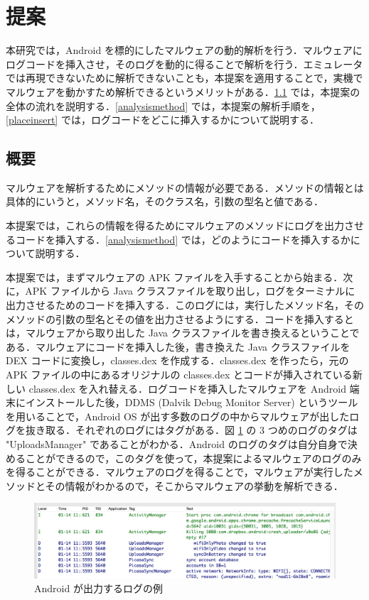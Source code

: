 \section{提案}
本研究では，Android を標的にしたマルウェアの動的解析を行う．マルウェアにログコードを挿入させ，そのログを動的に得ることで解析を行う．エミュレータでは再現できないために解析できないことも，本提案を適用することで，実機でマルウェアを動かすため解析できるというメリットがある．\ref{overview} では，本提案の全体の流れを説明する．\ref{analysismethod} では，本提案の解析手順を，\ref{placeinsert} では，ログコードをどこに挿入するかについて説明する．

\subsection{概要}
\label{overview}
マルウェアを解析するためにメソッドの情報が必要である．メソッドの情報とは具体的にいうと，メソッド名，そのクラス名，引数の型名と値である．

本提案では，これらの情報を得るためにマルウェアのメソッドにログを出力させるコードを挿入する．\ref{analysismethod} では，どのようにコードを挿入するかについて説明する．

本提案では，まずマルウェアの APK ファイルを入手することから始まる．次に，APK ファイルから Java クラスファイルを取り出し，ログをターミナルに出力させるためのコードを挿入する．このログには，実行したメソッド名，そのメソッドの引数の型名とその値を出力させるようにする．コードを挿入するとは，マルウェアから取り出した Java クラスファイルを書き換えるということである．マルウェアにコードを挿入した後，書き換えた Java クラスファイルを DEX コードに変換し，classes.dex を作成する．classes.dex を作ったら，元の APK ファイルの中にあるオリジナルの classes.dex とコードが挿入されている新しい classes.dex を入れ替える．ログコードを挿入したマルウェアを Android 端末にインストールした後，DDMS (Dalvik Debug Monitor Server) というツールを用いることで，Android OS が出す多数のログの中からマルウェアが出したログを抜き取る．それぞれのログにはタグがある．図 \ref{examplelog} の 3 つめのログのタグは "UploadsManager" であることがわかる．Android のログのタグは自分自身で決めることができるので，このタグを使って，本提案によるマルウェアのログのみを得ることができる．マルウェアのログを得ることで，マルウェアが実行したメソッドとその情報がわかるので，そこからマルウェアの挙動を解析できる．

\begin{figure}[t]
\begin{center}
\includegraphics[scale=0.2]{androidlogexample.eps}
\end{center}
\caption{Android が出力するログの例}
\label{examplelog}
\end{figure}

